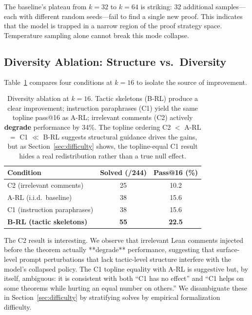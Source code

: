 \documentclass{article}
\begin{document}
The baseline's plateau from $k{=}32$ to $k{=}64$ is striking: 32 additional samples---each with different random seeds---fail to find a single new proof. This indicates that the model is trapped in a narrow region of the proof strategy space. Temperature sampling alone cannot break this mode collapse.

\subsection{Diversity Ablation: Structure vs.\ Diversity}
\label{sec:ablation}

Table~\ref{tab:ablation} compares four conditions at $k{=}16$ to isolate the source of improvement.

\begin{table}[h]
\centering
\begin{tabular}{lcc}
\toprule
\textbf{Condition} & \textbf{Solved (/244)} & \textbf{Pass@16 (\%)} \\
\midrule
C2 (irrelevant comments) & 25 & 10.2 \\
A-RL (i.i.d.\ baseline) & 38 & 15.6 \\
C1 (instruction paraphrases) & 38 & 15.6 \\
\textbf{B-RL (tactic skeletons)} & \textbf{55} & \textbf{22.5} \\
\bottomrule
\end{tabular}
\caption{Diversity ablation at $k{=}16$. Tactic skeletons (B-RL) produce a clear improvement; instruction paraphrases (C1) yield the same topline pass@16 as A-RL; irrelevant comments (C2) actively \textbf{degrade} performance by 34\%. The topline ordering C2 $<$ A-RL $=$ C1 $\ll$ B-RL suggests structural guidance drives the gains, but as Section~\ref{sec:difficulty} shows, the topline-equal C1 result hides a real redistribution rather than a true null effect.}
\label{tab:ablation}
\end{table}

The C2 result is interesting. We observe that irrelevant Lean comments injected before the theorem actually **degrade** performance, suggesting that surface-level prompt perturbations that lack tactic-level structure interfere with the model's collapsed policy. The C1 topline equality with A-RL is suggestive but, by itself, ambiguous: it is consistent with both ``C1 has no effect'' and ``C1 helps on some theorems while hurting an equal number on others.'' We disambiguate these in Section~\ref{sec:difficulty} by stratifying solves by empirical formalization difficulty.
\end{document}
